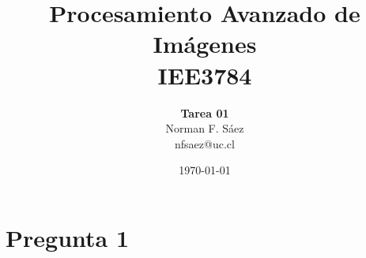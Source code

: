 \documentclass[a4paper,10pt]{article}
\title{Procesamiento Avanzado de Imágenes\\IEE3784}
\author{\textbf{Tarea 01}\\Norman F. S\'aez\\nfsaez@uc.cl}
\date{\today}
\begin{document}
\maketitle
\section{Pregunta 1}

\end{document}
